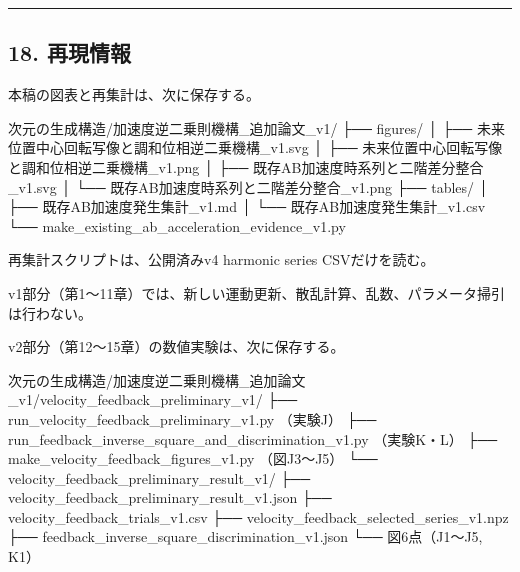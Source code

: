 \documentclass[
  a4paper,
]{ltjsarticle}
\newenvironment{Shaded}{}{}
\newcommand{\NormalTok}[1]{#1}
\begin{document}
\begin{center}\rule{0.5\linewidth}{0.5pt}\end{center}

\subsection{18. 再現情報}\label{ux518dux73feux60c5ux5831}

本稿の図表と再集計は、次に保存する。

\begin{Shaded}
\begin{Highlighting}[]
\NormalTok{次元の生成構造/加速度逆二乗則機構\_追加論文\_v1/}
\NormalTok{├── figures/}
\NormalTok{│   ├── 未来位置中心回転写像と調和位相逆二乗機構\_v1.svg}
\NormalTok{│   ├── 未来位置中心回転写像と調和位相逆二乗機構\_v1.png}
\NormalTok{│   ├── 既存AB加速度時系列と二階差分整合\_v1.svg}
\NormalTok{│   └── 既存AB加速度時系列と二階差分整合\_v1.png}
\NormalTok{├── tables/}
\NormalTok{│   ├── 既存AB加速度発生集計\_v1.md}
\NormalTok{│   └── 既存AB加速度発生集計\_v1.csv}
\NormalTok{└── make\_existing\_ab\_acceleration\_evidence\_v1.py}
\end{Highlighting}
\end{Shaded}

再集計スクリプトは、公開済みv4 harmonic series CSVだけを読む。

v1部分（第1〜11章）では、新しい運動更新、散乱計算、乱数、パラメータ掃引は行わない。

v2部分（第12〜15章）の数値実験は、次に保存する。

\begin{Shaded}
\begin{Highlighting}[]
\NormalTok{次元の生成構造/加速度逆二乗則機構\_追加論文\_v1/velocity\_feedback\_preliminary\_v1/}
\NormalTok{├── run\_velocity\_feedback\_preliminary\_v1.py          （実験J）}
\NormalTok{├── run\_feedback\_inverse\_square\_and\_discrimination\_v1.py （実験K・L）}
\NormalTok{├── make\_velocity\_feedback\_figures\_v1.py             （図J3〜J5）}
\NormalTok{└── velocity\_feedback\_preliminary\_result\_v1/}
\NormalTok{    ├── velocity\_feedback\_preliminary\_result\_v1.json}
\NormalTok{    ├── velocity\_feedback\_trials\_v1.csv}
\NormalTok{    ├── velocity\_feedback\_selected\_series\_v1.npz}
\NormalTok{    ├── feedback\_inverse\_square\_discrimination\_v1.json}
\NormalTok{    └── 図6点（J1〜J5, K1）}
\end{Highlighting}
\end{Shaded}
\end{document}
